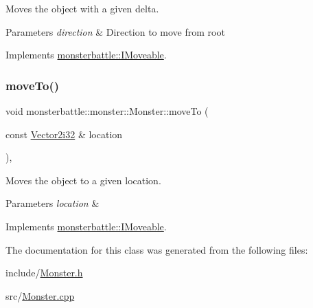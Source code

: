 Moves the object with a given delta. 


\begin{DoxyParams}{Parameters}
{\em direction} & Direction to move from root \\
\hline
\end{DoxyParams}


Implements \hyperlink{structmonsterbattle_1_1IMoveable_a487ec192d82b97e4c5b6d4706fc8db17}{monsterbattle\+::\+I\+Moveable}.

\mbox{\label{classmonsterbattle_1_1monster_1_1Monster_ac256c749ccdbec0390da7949827b4851}} 
\subsubsection{\texorpdfstring{move\+To()}{moveTo()}}
{\footnotesize\ttfamily void monsterbattle\+::monster\+::\+Monster\+::move\+To (\begin{DoxyParamCaption}\item[{const \hyperlink{structmonsterbattle_1_1Vector}{Vector2i32} \&}]{location }\end{DoxyParamCaption})\hspace{0.3cm}{\ttfamily [override]}, {\ttfamily [virtual]}}



Moves the object to a given location. 


\begin{DoxyParams}{Parameters}
{\em location} & \\
\hline
\end{DoxyParams}


Implements \hyperlink{structmonsterbattle_1_1IMoveable_a61cc433b2a635cc3c52d807fc446a6a4}{monsterbattle\+::\+I\+Moveable}.



The documentation for this class was generated from the following files\+:\begin{DoxyCompactItemize}
\item 
include/\hyperlink{Monster_8h}{Monster.\+h}\item 
src/\hyperlink{Monster_8cpp}{Monster.\+cpp}\end{DoxyCompactItemize}
